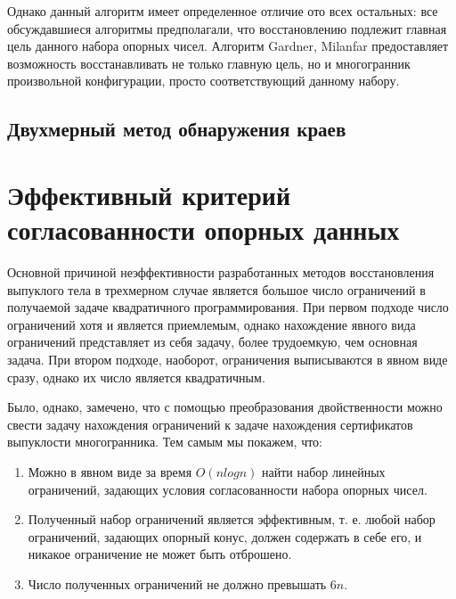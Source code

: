 \documentclass[a4paper, 12pt, titlepage]{article}
\theoremstyle{definition}
\theoremstyle{plain}
\theoremstyle{plain}
\begin{document}
Однако данный алгоритм имеет определенное отличие ото всех остальных: все
обсуждавшиеся алгоритмы предполагали, что восстановлению подлежит главная
цель данного набора опорных чисел. Алгоритм Gardner, Milanfar предоставляет
возможность восстанавливать не только главную цель, но и многогранник
произвольной конфигурации, просто соответствующий данному набору.

\subsection{Двухмерный метод обнаружения краев}



\newpage
\section{Эффективный критерий согласованности опорных данных}
\label{sec:effictive-criterion}

Основной причиной неэффективности разработанных методов восстановления
выпуклого тела в трехмерном случае является большое число ограничений в
получаемой задаче квадратичного программирования. При первом подходе число
ограничений хотя и является приемлемым, однако нахождение явного вида
ограничений представляет из себя задачу, более трудоемкую, чем основная задача.
При втором подходе, наоборот, ограничения выписываются в явном виде сразу,
однако их число является квадратичным.

Было, однако, замечено, что с помощью преобразования двойственности можно
свести задачу нахождения ограничений к задаче нахождения сертификатов
выпуклости многогранника. Тем самым мы покажем, что:

\begin{enumerate}
 \item Можно в явном виде за время $O(n log n)$ найти набор линейных
ограничений, задающих условия согласованности набора опорных чисел.
 \item Полученный набор ограничений является эффективным, т. е. любой набор
ограничений, задающих опорный конус, должен содержать в себе его, и никакое
ограничение не может быть отброшено.
 \item Число полученных ограничений не должно превышать $6 n$.
\end{enumerate}
\end{document}
